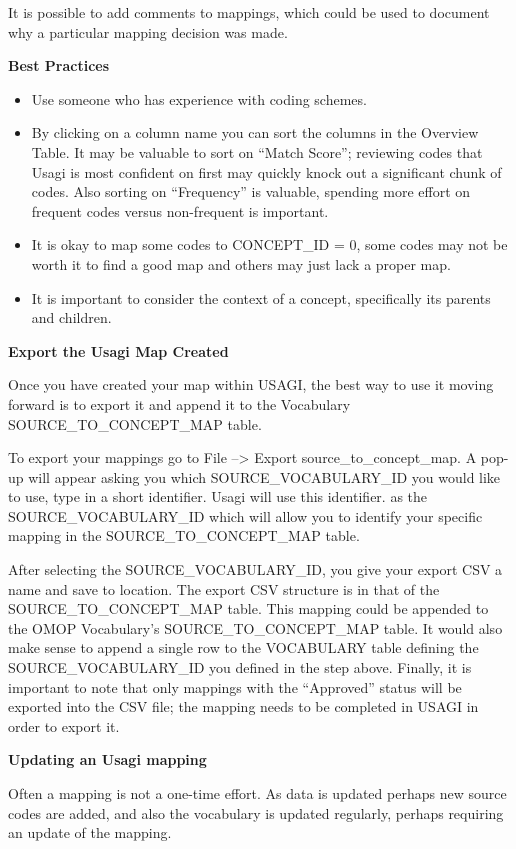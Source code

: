 \documentclass[11pt]{book}
\providecommand{\tightlist}{%
  \setlength{\itemsep}{0pt}\setlength{\parskip}{0pt}}
\theoremstyle{definition}
\theoremstyle{definition}
\theoremstyle{definition}
\theoremstyle{remark}
\begin{document}
It is possible to add comments to mappings, which could be used to document why a particular mapping decision was made.

\textbf{Best Practices}

\begin{itemize}
\tightlist
\item
  Use someone who has experience with coding schemes.
\item
  By clicking on a column name you can sort the columns in the Overview Table. It may be valuable to sort on ``Match Score''; reviewing codes that Usagi is most confident on first may quickly knock out a significant chunk of codes. Also sorting on ``Frequency'' is valuable, spending more effort on frequent codes versus non-frequent is important.
\item
  It is okay to map some codes to CONCEPT\_ID = 0, some codes may not be worth it to find a good map and others may just lack a proper map.
\item
  It is important to consider the context of a concept, specifically its parents and children.
\end{itemize}

\textbf{Export the Usagi Map Created}

Once you have created your map within USAGI, the best way to use it moving forward is to export it and append it to the Vocabulary SOURCE\_TO\_CONCEPT\_MAP table.

To export your mappings go to File --\textgreater{} Export source\_to\_concept\_map. A pop-up will appear asking you which SOURCE\_VOCABULARY\_ID you would like to use, type in a short identifier. Usagi will use this identifier. as the SOURCE\_VOCABULARY\_ID which will allow you to identify your specific mapping in the SOURCE\_TO\_CONCEPT\_MAP table.

After selecting the SOURCE\_VOCABULARY\_ID, you give your export CSV a name and save to location. The export CSV structure is in that of the SOURCE\_TO\_CONCEPT\_MAP table. This mapping could be appended to the OMOP Vocabulary's SOURCE\_TO\_CONCEPT\_MAP table. It would also make sense to append a single row to the VOCABULARY table defining the SOURCE\_VOCABULARY\_ID you defined in the step above. Finally, it is important to note that only mappings with the ``Approved'' status will be exported into the CSV file; the mapping needs to be completed in USAGI in order to export it.

\textbf{Updating an Usagi mapping}

Often a mapping is not a one-time effort. As data is updated perhaps new source codes are added, and also the vocabulary is updated regularly, perhaps requiring an update of the mapping.
\end{document}
